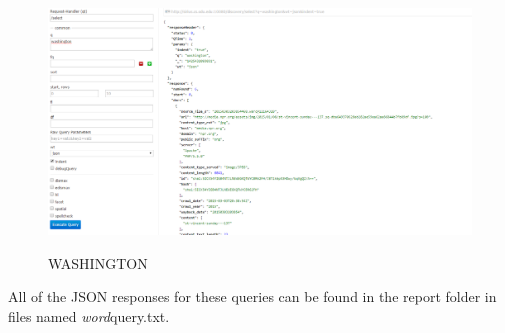 \documentclass[12pt]{article}
\begin{document}
\begin{figure}[H]
    \caption{WASHINGTON}
    \centering
    \includegraphics[scale=0.5]{washingtonquery.PNG}
\end{figure}

All of the JSON responses for these queries can be found in the report folder in files named \textit{word}query.txt.
\end{document}
